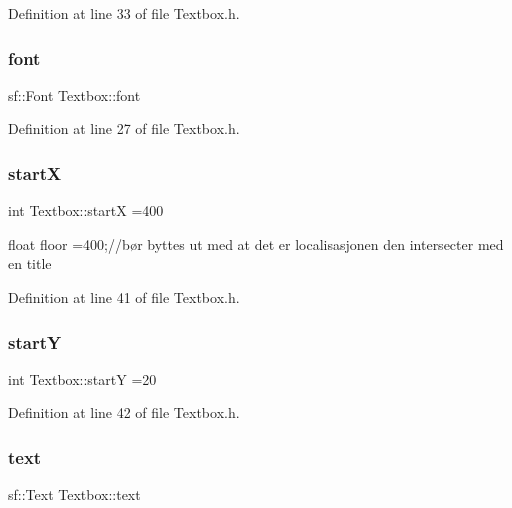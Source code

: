 Definition at line 33 of file Textbox.\+h.

\hypertarget{class_textbox_a45eac53d4f51e36a8c0acfdc9df2f0cb}{}\label{class_textbox_a45eac53d4f51e36a8c0acfdc9df2f0cb} 
\subsubsection{\texorpdfstring{font}{font}}
{\footnotesize\ttfamily sf\+::\+Font Textbox\+::font}



Definition at line 27 of file Textbox.\+h.

\hypertarget{class_textbox_a8b9942b46c9fab7ed505918750174006}{}\label{class_textbox_a8b9942b46c9fab7ed505918750174006} 
\subsubsection{\texorpdfstring{startX}{startX}}
{\footnotesize\ttfamily int Textbox\+::startX =400}



float floor =400;//bør byttes ut med at det er localisasjonen den intersecter med en title 



Definition at line 41 of file Textbox.\+h.

\hypertarget{class_textbox_a7cc50c3fa4ef2866a7d2acc7f2d5565b}{}\label{class_textbox_a7cc50c3fa4ef2866a7d2acc7f2d5565b} 
\subsubsection{\texorpdfstring{startY}{startY}}
{\footnotesize\ttfamily int Textbox\+::startY =20}



Definition at line 42 of file Textbox.\+h.

\hypertarget{class_textbox_a4f79784c45871da706e57c8435c8dff3}{}\label{class_textbox_a4f79784c45871da706e57c8435c8dff3} 
\subsubsection{\texorpdfstring{text}{text}}
{\footnotesize\ttfamily sf\+::\+Text Textbox\+::text}



